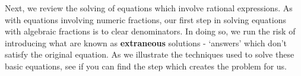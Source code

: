 \documentclass[10pt]{article}
\begin{document}
\begin{ex}
\begin{enumerate}
%
%																							



																
\end{enumerate}

\end{ex}


Next, we review the solving of equations which involve rational expressions.  As with equations involving numeric fractions, our first step in solving equations with algebraic fractions is to clear denominators.  In doing so, we run the risk of introducing what are known as \textbf{extraneous} solutions - `answers' which don't satisfy the original equation.  As we illustrate the techniques used to solve these basic equations, see if you can find the step which creates the problem for us.
\end{document}
